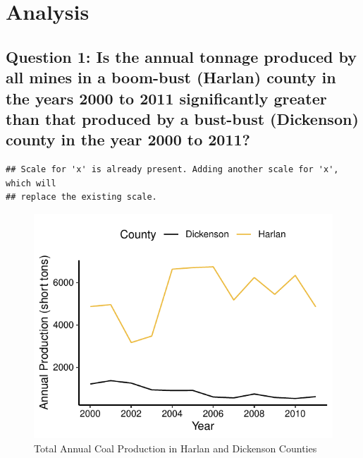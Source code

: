 \documentclass[12pt,]{article}
\begin{document}
\newpage

\hypertarget{analysis}{%
\section{Analysis}\label{analysis}}

\hypertarget{question-1-is-the-annual-tonnage-produced-by-all-mines-in-a-boom-bust-harlan-county-in-the-years-2000-to-2011-significantly-greater-than-that-produced-by-a-bust-bust-dickenson-county-in-the-year-2000-to-2011}{%
\subsection{Question 1: Is the annual tonnage produced by all mines in a
boom-bust (Harlan) county in the years 2000 to 2011 significantly
greater than that produced by a bust-bust (Dickenson) county in the year
2000 to
2011?}\label{question-1-is-the-annual-tonnage-produced-by-all-mines-in-a-boom-bust-harlan-county-in-the-years-2000-to-2011-significantly-greater-than-that-produced-by-a-bust-bust-dickenson-county-in-the-year-2000-to-2011}}

\begin{verbatim}
## Scale for 'x' is already present. Adding another scale for 'x', which will
## replace the existing scale.
\end{verbatim}

\begin{figure}
\centering
\includegraphics{Smith_ENV872_Project_files/figure-latex/unnamed-chunk-7-1.pdf}
\caption{\label{fig:figs} Total Annual Coal Production in Harlan and
Dickenson Counties}
\end{figure}
\end{document}
